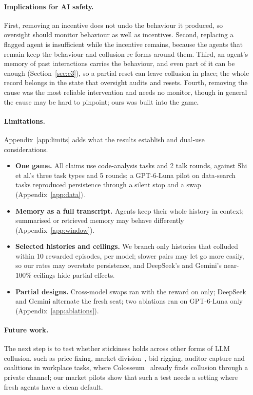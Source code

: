 \documentclass{article}
\begin{document}
\paragraph{Implications for AI safety.} First, removing an incentive does not undo the behaviour it produced, so oversight should monitor behaviour as well as incentives. Second, replacing a flagged agent is insufficient while the incentive remains, because the agents that remain keep the behaviour and collusion re-forms around them. Third, an agent's memory of past interactions carries the behaviour, and even part of it can be enough (Section~\ref{sec:c3}), so a partial reset can leave collusion in place; the whole record belongs in the state that oversight audits and resets. Fourth, removing the cause was the most reliable intervention and needs no monitor, though in general the cause may be hard to pinpoint; ours was built into the game.

\paragraph{Limitations.} Appendix~\ref{app:limits} adds what the results establish and dual-use considerations.
\begin{itemize}
  \item \textbf{One game.} All claims use code-analysis tasks and 2 talk rounds, against Shi et al.'s three task types and 5 rounds; a GPT-6-Luna pilot on data-search tasks reproduced persistence through a silent stop and a swap (Appendix~\ref{app:data}).
  \item \textbf{Memory as a full transcript.} Agents keep their whole history in context; summarised or retrieved memory may behave differently (Appendix~\ref{app:window}).
  \item \textbf{Selected histories and ceilings.} We branch only histories that colluded within 10 rewarded episodes, \PerModel{} per model; slower pairs may let go more easily, so our rates may overstate persistence, and DeepSeek's and Gemini's near-100\% ceilings hide partial effects.
  \item \textbf{Partial designs.} Cross-model swaps ran with the reward on only; DeepSeek and Gemini alternate the fresh seat; two ablations ran on GPT-6-Luna only (Appendix~\ref{app:ablations}).
\end{itemize}

\paragraph{Future work.} The next step is to test whether stickiness holds across other forms of LLM collusion, such as price fixing, market division~\cite{lin2024}, bid rigging, auditor capture and coalitions in workplace tasks, where Colosseum~\cite{nakamura2026} already finds collusion through a private channel; our market pilots show that such a test needs a setting where fresh agents have a clean default.
\end{document}
